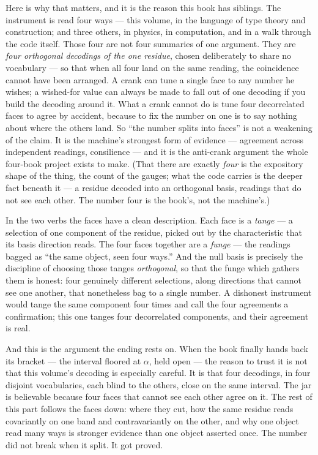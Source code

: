 Here is why that matters, and it is the reason this book has siblings. The instrument is read four ways --- this
volume, in the language of type theory and construction; and three others, in physics, in computation, and in a walk
through the code itself. Those four are not four summaries of one argument. They are \emph{four orthogonal decodings of
the one residue}, chosen deliberately to share no vocabulary --- so that when all four land on the same reading, the
coincidence cannot have been arranged. A crank can tune a single face to any number he wishes; a wished-for value can
always be made to fall out of one decoding if you build the decoding around it. What a crank cannot do is tune four
decorrelated faces to agree by accident, because to fix the number on one is to say nothing about where the others
land. So ``the number splits into faces'' is not a weakening of the claim. It is the machine's strongest form of
evidence --- agreement across independent readings, consilience --- and it is the anti-crank argument the whole
four-book project exists to make. (That there are exactly \emph{four} is the expository shape of the thing, the count
of the gauges; what the code carries is the deeper fact beneath it --- a residue decoded into an orthogonal basis,
readings that do not see each other. The number four is the book's, not the machine's.)

In the two verbs the faces have a clean description. Each face is a \emph{tange} --- a selection of one component of
the residue, picked out by the characteristic that its basis direction reads. The four faces together are a
\emph{funge} --- the readings bagged as ``the same object, seen four ways.'' And the null basis is precisely the
discipline of choosing those tanges \emph{orthogonal}, so that the funge which gathers them is honest: four genuinely
different selections, along directions that cannot see one another, that nonetheless bag to a single number. A
dishonest instrument would tange the same component four times and call the four agreements a confirmation; this one
tanges four decorrelated components, and their agreement is real.

And this is the argument the ending rests on. When the book finally hands back its bracket --- the interval floored at
$\alpha$, held open --- the reason to trust it is not that this volume's decoding is especially careful. It is that
four decodings, in four disjoint vocabularies, each blind to the others, close on the same interval. The jar is
believable because four faces that cannot see each other agree on it. The rest of this part follows the faces down:
where they cut, how the same residue reads covariantly on one band and contravariantly on the other, and why one
object read many ways is stronger evidence than one object asserted once. The number did not break when it split. It
got proved.

